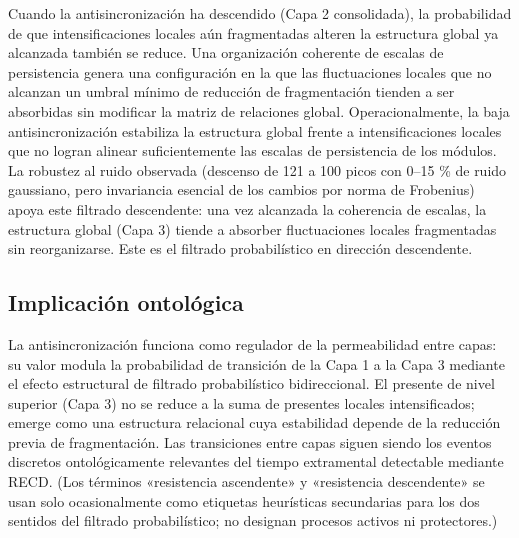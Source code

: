 Cuando la antisincronización ha descendido (Capa 2 consolidada), la probabilidad de que intensificaciones locales aún fragmentadas alteren la estructura global ya alcanzada también se reduce. Una organización coherente de escalas de persistencia genera una configuración en la que las fluctuaciones locales que no alcanzan un umbral mínimo de reducción de fragmentación tienden a ser absorbidas sin modificar la matriz de relaciones global. Operacionalmente, la baja antisincronización estabiliza la estructura global frente a intensificaciones locales que no logran alinear suficientemente las escalas de persistencia de los módulos. La robustez al ruido observada (descenso de 121 a 100 picos con 0--15 \% de ruido gaussiano, pero invariancia esencial de los cambios por norma de Frobenius) apoya este filtrado descendente: una vez alcanzada la coherencia de escalas, la estructura global (Capa 3) tiende a absorber fluctuaciones locales fragmentadas sin reorganizarse. Este es el filtrado probabilístico en dirección descendente.

\subsection{Implicación ontológica}

La antisincronización funciona como regulador de la permeabilidad entre capas: su valor modula la probabilidad de transición de la Capa 1 a la Capa 3 mediante el efecto estructural de filtrado probabilístico bidireccional. El presente de nivel superior (Capa 3) no se reduce a la suma de presentes locales intensificados; emerge como una estructura relacional cuya estabilidad depende de la reducción previa de fragmentación. Las transiciones entre capas siguen siendo los eventos discretos ontológicamente relevantes del tiempo extramental detectable mediante RECD. (Los términos «resistencia ascendente» y «resistencia descendente» se usan solo ocasionalmente como etiquetas heurísticas secundarias para los dos sentidos del filtrado probabilístico; no designan procesos activos ni protectores.)